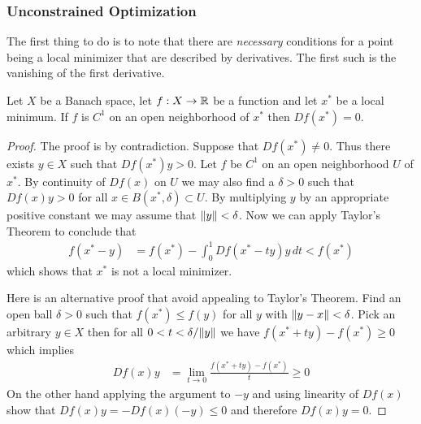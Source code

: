 \subsubsection{Unconstrained Optimization}

The first thing to do is to note that there are \emph{necessary}
conditions for a point being a local minimizer that are described by
derivatives.  The first such is the vanishing of the first derivative.

\begin{thm}\label{VanishingFirstDerivativeAtLocalMinimum}Let $X$ be a
  Banach space, let $f : X \to \mathbb{R}$ be a function and let $x^*$ be
  a local minimum.  If $f$ is $C^1$ on an open neighborhood of $x^*$
  then $Df(x^*) = 0$.
\end{thm}
\begin{proof}
The proof is by contradiction.  Suppose that $Df(x^*) \neq 0$.  Thus
there exists $y \in X$ such that $Df(x^*)y > 0$.  Let $f$ be $C^1$ on
an open neighborhood $U$ of $x^*$.  By continuity of $Df(x)$ on $U$ we
may also find a $\delta > 0$ such that $Df(x) y > 0$ for all $x \in
B(x^*, \delta) \subset U$.  By multiplying $y$ by an
appropriate positive constant we may assume that $\lVert y \rVert < \delta$.  Now we can
apply Taylor's Theorem to conclude that 
\begin{align*}
f(x^* - y) &= f(x^*) - \int_0^1 Df(x^*-ty) y \, dt < f(x^*)
\end{align*}
which shows that $x^*$ is not a local minimizer.

Here is an alternative proof that avoid appealing to Taylor's Theorem.
Find an open ball $\delta > 0$ such that $f(x^*) \leq f(y)$
for all $y$ with $\lVert y - x \rVert < \delta$.  Pick an arbitrary $y \in X$
then for all $0 < t < \delta/\lVert y \rVert$ we have $f(x^* + t y) - f(x^*)
\geq 0$ which implies 
\begin{align*}
Df(x) y &= \lim_{t \to 0} \frac{f(x^* + ty) - f(x^*)}{t} \geq 0
\end{align*}
On the other hand applying the argument to $-y$ and using linearity of
$Df(x)$ show that $Df(x) y = -Df(x) (-y) \leq 0$ and therefore $Df(x)y
= 0$.
\end{proof}

